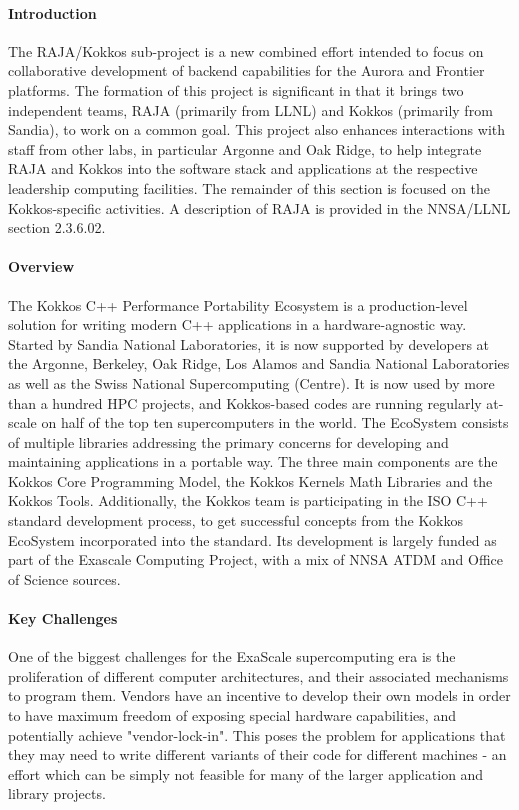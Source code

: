 \paragraph{Introduction}
The RAJA/Kokkos sub-project is a new combined effort intended to focus on collaborative development of backend capabilities for the Aurora and Frontier platforms.  The formation of this project is significant in that it brings two independent teams, RAJA (primarily from LLNL) and Kokkos (primarily from Sandia), to work on a common goal. This project also enhances interactions with staff from other labs, in particular Argonne and Oak Ridge, to help integrate RAJA and Kokkos into the software stack and applications at the respective leadership computing facilities.  The remainder of this section is focused on the Kokkos-specific activities. A description of RAJA is provided in the NNSA/LLNL section 2.3.6.02.


\paragraph{Overview} 

The Kokkos C++ Performance Portability Ecosystem is a production-level solution for writing modern C++ applications in a hardware-agnostic way.
Started by Sandia National Laboratories, it is now supported by developers at the Argonne, Berkeley, Oak Ridge, Los Alamos and Sandia National Laboratories as well as the Swiss National Supercomputing (Centre).
It is now used by more than a hundred HPC projects, and Kokkos-based codes are running regularly at-scale on half of the top ten supercomputers in the world. 
The EcoSystem consists of multiple libraries addressing the primary concerns for developing and maintaining applications in a portable way.
The three main components are the Kokkos Core Programming Model, the Kokkos Kernels Math Libraries and the Kokkos Tools.
Additionally, the Kokkos team is participating in the ISO C++ standard development process, to get successful concepts from the Kokkos EcoSystem incorporated into the standard. 
Its development is largely funded as part of the Exascale Computing Project, with a mix of NNSA ATDM and Office of Science sources. 

 
\paragraph{Key Challenges}

One of the biggest challenges for the ExaScale supercomputing era is the proliferation of different computer architectures, and their associated mechanisms to program them.
Vendors have an incentive to develop their own models in order to have maximum freedom of exposing special hardware capabilities, and potentially achieve "vendor-lock-in".
This poses the problem for applications that they may need to write different variants of their code for different machines - an effort which can be simply not feasible for many of the larger application and library projects.

